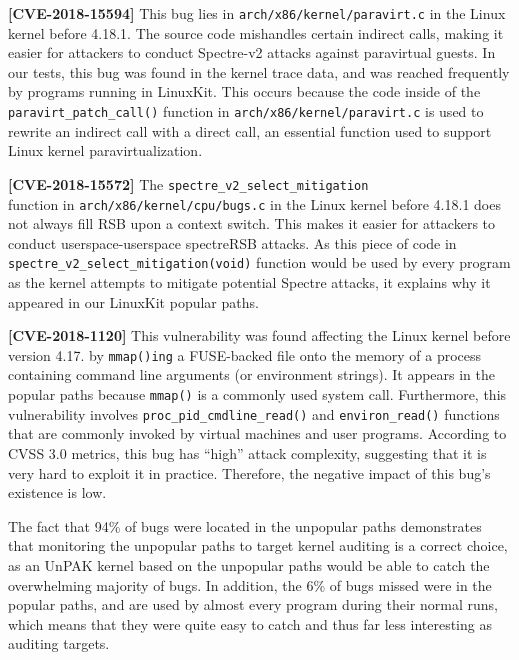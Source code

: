 \noindent
\textbf{[CVE-2018-15594]} 
\newline
This bug lies in \texttt{arch/x86/kernel/paravirt.c} in the Linux kernel before 4.18.1. The source code mishandles certain indirect calls, 
making it easier for attackers to conduct Spectre-v2 attacks against paravirtual guests. 
In our tests, this bug was found in the  kernel trace data, and was reached frequently by programs running in LinuxKit. 
This occurs because the code inside of the \texttt{paravirt\_patch\_call()} function in \texttt{arch/x86/kernel/paravirt.c} is used to rewrite an indirect call with a direct call, 
an essential function used to support Linux kernel paravirtualization. 

\noindent
\textbf{[CVE-2018-15572]} 
\newline
The \texttt{spectre\_v2\_select\_mitigation}  \\ 
function in \texttt{arch/x86/kernel/cpu/bugs.c} in the Linux kernel before 4.18.1 does not always fill RSB upon a context switch. 
This makes it easier for attackers to conduct userspace-userspace spectreRSB attacks. 
As this piece of code in \\
\texttt{spectre\_v2\_select\_mitigation(void)} function would be used by every program as the kernel attempts to mitigate potential Spectre attacks, 
it explains why it appeared in our LinuxKit popular paths. 

\noindent
\textbf{[CVE-2018-1120]} 
\newline
This vulnerability was found affecting the Linux kernel before version 4.17. by 
\texttt{mmap()ing} a FUSE-backed file onto the memory of a process containing command line arguments (or environment strings). 
It appears in the popular paths because \texttt{mmap()} is a commonly used system call. 
Furthermore, this vulnerability involves \texttt{proc\_pid\_cmdline\_read()} and \texttt{environ\_read()} functions that are commonly invoked by virtual machines and user programs. 
According to CVSS 3.0 \cite{CVSS} metrics, this bug has ``high'' attack complexity, suggesting that it is very hard to exploit it in practice. 
Therefore, the negative impact of this bug’s existence is low. 

The fact that 94\% of bugs were located in the unpopular paths demonstrates that monitoring the unpopular paths to target kernel auditing is a correct choice, 
as an UnPAK kernel based on the unpopular paths would be able to catch the overwhelming majority of bugs. In addition, the 6\% of bugs missed were in the popular paths, 
and are used by almost every program during their normal runs, which means that they were quite easy to catch and thus far less interesting as auditing targets. 

